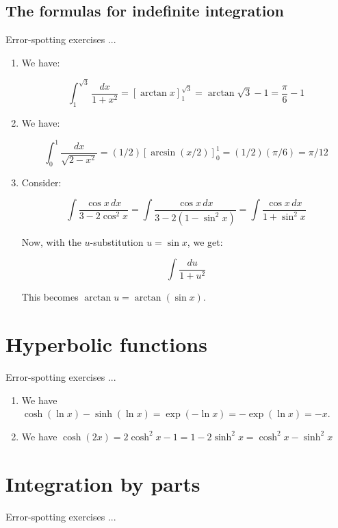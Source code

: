 \documentclass[10pt]{amsart}
\begin{document}
\subsection{The formulas for indefinite integration}

Error-spotting exercises ...

\begin{enumerate}
\item We have:

  $$\int_1^{\sqrt{3}} \frac{dx}{1 + x^2} = [\arctan x]_1^{\sqrt{3}} = \arctan \sqrt{3} - 1 = \frac{\pi}{6} -1$$
\item We have:

  $$\int_0^1 \frac{dx}{\sqrt{2 - x^2}} = (1/2)[\arcsin(x/2)]_0^1 = (1/2)(\pi/6) = \pi/12$$

\item Consider:

  $$\int \frac{\cos x \, dx}{3 - 2 \cos^2x} = \int \frac{\cos x \, dx}{3 - 2(1 - \sin^2x)} = \int \frac{\cos x \, dx}{1 + \sin^2x}$$

  Now, with the $u$-substitution $u = \sin x$, we get:

  $$\int \frac{du}{1 + u^2}$$

  This becomes $\arctan u = \arctan (\sin x)$.

\end{enumerate}

\section{Hyperbolic functions}

Error-spotting exercises ...

\begin{enumerate}
\item We have $\cosh(\ln x) - \sinh(\ln x) = \exp(-\ln x) = -\exp(\ln x) = -x$.
\item We have $\cosh(2x) = 2\cosh^2x - 1 = 1 - 2\sinh^2x = \cosh^2x - \sinh^2x$
\end{enumerate}

\section{Integration by parts}

Error-spotting exercises ...
\end{document}
